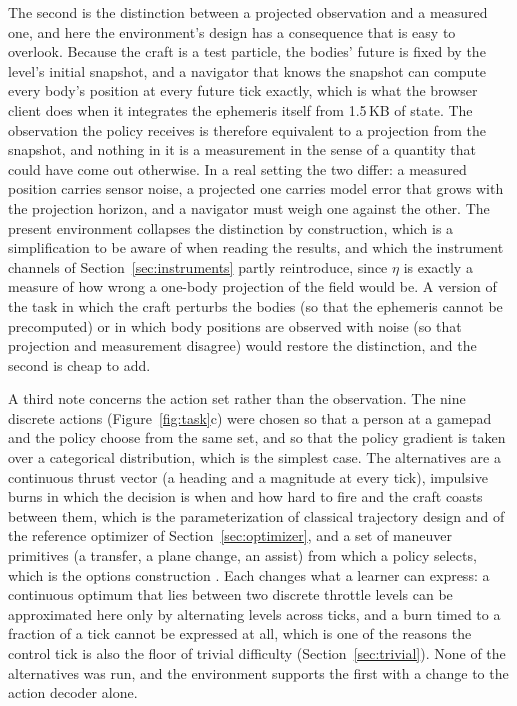 \documentclass[11pt]{article}
\begin{document}
The second is the distinction between a projected observation and a
measured one, and here the environment's design has a consequence that is
easy to overlook. Because the craft is a test particle, the bodies' future
is fixed by the level's initial snapshot, and a navigator that knows the
snapshot can compute every body's position at every future tick exactly,
which is what the browser client does when it integrates the ephemeris
itself from 1.5\,KB of state. The observation the policy receives is
therefore equivalent to a projection from the snapshot, and nothing in it
is a measurement in the sense of a quantity that could have come out
otherwise. In a real setting the two differ: a measured position carries
sensor noise, a projected one carries model error that grows with the
projection horizon, and a navigator must weigh one against the other. The
present environment collapses the distinction by construction, which is a
simplification to be aware of when reading the results, and which the
instrument channels of Section~\ref{sec:instruments} partly reintroduce,
since $\eta$ is exactly a measure of how wrong a one-body projection of the
field would be. A version of the task in which the craft perturbs the bodies
(so that the ephemeris cannot be precomputed) or in which body positions
are observed with noise (so that projection and measurement disagree) would
restore the distinction, and the second is cheap to add.

A third note concerns the action set rather than the observation. The nine
discrete actions (Figure~\ref{fig:task}c) were chosen so that a person at a
gamepad and the policy choose from the same set, and so that the policy
gradient is taken over a categorical distribution, which is the simplest
case. The alternatives are a continuous thrust vector (a heading and a
magnitude at every tick), impulsive burns in which the decision is when and
how hard to fire and the craft coasts between them, which is the
parameterization of classical trajectory design and of the reference
optimizer of Section~\ref{sec:optimizer}, and a set of maneuver primitives
(a transfer, a plane change, an assist) from which a policy selects, which
is the options construction \cite{sutton1999}. Each changes what a learner
can express: a continuous optimum that lies between two discrete throttle
levels can be approximated here only by alternating levels across ticks,
and a burn timed to a fraction of a tick cannot be expressed at all, which
is one of the reasons the control tick is also the floor of trivial
difficulty (Section~\ref{sec:trivial}). None of the alternatives was run,
and the environment supports the first with a change to the action decoder
alone.

















\end{document}
